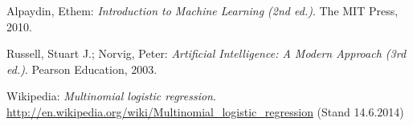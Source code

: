 \documentclass[12pt, oneside]{report}   	%
\begin{document}
\clearpage
{}
{}


\linespread{1.2}\selectfont
\begin{thebibliography}{99}

 Alpaydin, Ethem: \emph{Introduction to Machine Learning (2nd ed.)}. The MIT Press, 2010.

 Russell, Stuart J.; Norvig, Peter: \emph{Artificial Intelligence: A Modern Approach (3rd ed.)}. Pearson Education, 2003.

 Wikipedia: \emph{Multinomial logistic regression}. \url{http://en.wikipedia.org/wiki/Multinomial_logistic_regression} (Stand 14.6.2014) 


\end{thebibliography}
\end{document}
